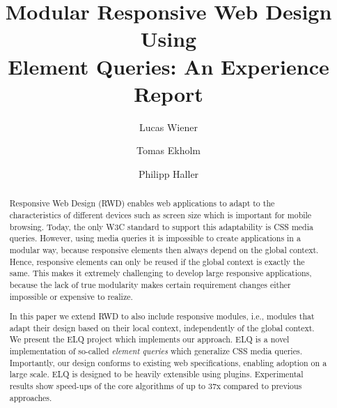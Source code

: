 \documentclass[sigconf,9pt]{acmart}
\newcommand{\elq}{ELQ}
\begin{document}
\title{Modular Responsive Web Design Using\\ Element Queries: An Experience Report}

\author{Lucas Wiener}

\author{Tomas Ekholm}

\author{Philipp Haller}

\renewcommand{\shortauthors}{L. Wiener et al.}
\renewcommand{\shorttitle}{Modular Responsive Web Design Using Element Queries}

\begin{abstract}
    Responsive Web Design (RWD) enables web applications to adapt to the characteristics of different devices such as screen size which is important for mobile browsing.
    Today, the only W3C standard to support this adaptability is CSS media queries.
    However, using media queries it is impossible to create applications in a modular way, because responsive elements then always depend on the global context.
    Hence, responsive elements can only be reused if the global context is exactly the same.
    This makes it extremely challenging to develop large responsive applications, because the lack of true modularity makes certain requirement changes either impossible or expensive to realize.

    In this paper we extend RWD to also include responsive modules, i.e., modules that adapt their design based on their local context, independently of the global context.
    We present the \elq{} project which implements our approach.
    \elq{} is a novel implementation of so-called \emph{element queries} which generalize CSS media queries.
    Importantly, our design conforms to existing web specifications, enabling adoption on a large scale.
    \elq{} is designed to be heavily extensible using plugins.
    Experimental results show speed-ups of the core algorithms of up to 37x compared to previous approaches.
\end{abstract}

%
%
\end{document}
